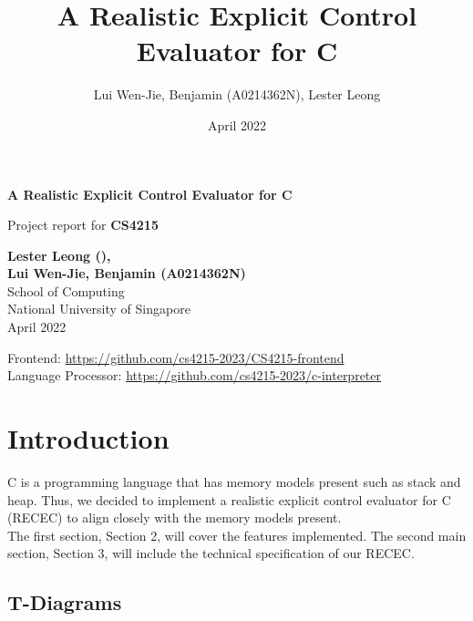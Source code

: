 \documentclass[a4paper]{article}
\title{A Realistic Explicit Control Evaluator for C}
\author{Lui Wen-Jie, Benjamin (A0214362N), Lester Leong }
\date{April 2022}
\begin{document}

\begin{titlepage}
    \begin{center}
        \vspace*{1cm}

        \LARGE
        \textbf{A Realistic Explicit Control Evaluator for C}

        \vspace{0.5cm}        
		Project report for \textbf{CS4215}

        \vspace{3cm}

        \Large
        \textbf{Lester Leong (), \\Lui Wen-Jie, Benjamin (A0214362N)}\\
        School of Computing\\
        National University of Singapore\\
        April 2022

		\vspace{3cm}
		\small
		Frontend: \url{https://github.com/cs4215-2023/CS4215-frontend} \\
		Language Processor: \url{https://github.com/cs4215-2023/c-interpreter}

		\vfill

    \end{center}
\end{titlepage}

\tableofcontents
\newpage

\section{Introduction}

C is a programming language that has memory models present such as stack and heap. Thus, we decided to implement a realistic explicit control evaluator for C (RECEC) to align closely with the memory models present. \\

The first section, Section 2, will cover the features implemented. The second main section, Section 3, will include the technical specification of our RECEC.

\subsection{T-Diagrams}
\end{document}
